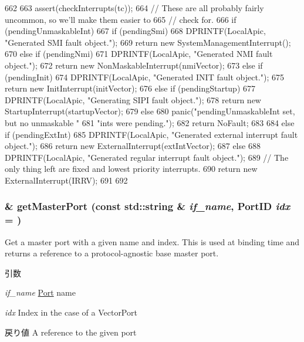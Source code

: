 \begin{DoxyCode}
662 {
663     assert(checkInterrupts(tc));
664     // These are all probably fairly uncommon, so we'll make them easier to
665     // check for.
666     if (pendingUnmaskableInt) {
667         if (pendingSmi) {
668             DPRINTF(LocalApic, "Generated SMI fault object.\n");
669             return new SystemManagementInterrupt();
670         } else if (pendingNmi) {
671             DPRINTF(LocalApic, "Generated NMI fault object.\n");
672             return new NonMaskableInterrupt(nmiVector);
673         } else if (pendingInit) {
674             DPRINTF(LocalApic, "Generated INIT fault object.\n");
675             return new InitInterrupt(initVector);
676         } else if (pendingStartup) {
677             DPRINTF(LocalApic, "Generating SIPI fault object.\n");
678             return new StartupInterrupt(startupVector);
679         } else {
680             panic("pendingUnmaskableInt set, but no unmaskable "
681                     "ints were pending.\n");
682             return NoFault;
683         }
684     } else if (pendingExtInt) {
685         DPRINTF(LocalApic, "Generated external interrupt fault object.\n");
686         return new ExternalInterrupt(extIntVector);
687     } else {
688         DPRINTF(LocalApic, "Generated regular interrupt fault object.\n");
689         // The only thing left are fixed and lowest priority interrupts.
690         return new ExternalInterrupt(IRRV);
691     }
692 }
\end{DoxyCode}
\hypertarget{classX86ISA_1_1Interrupts_ac66222ec5b6b7beb5d1189c07778bc8a}{
\subsubsection[{getMasterPort}]{\& getMasterPort (const std::string \& {\em if\_\-name}, \/  {\bf PortID} {\em idx} = {})}}
\label{classX86ISA_1_1Interrupts_ac66222ec5b6b7beb5d1189c07778bc8a}
Get a master port with a given name and index. This is used at binding time and returns a reference to a protocol-\/agnostic base master port.


\begin{DoxyParams}{引数}
\item[{\em if\_\-name}]\hyperlink{classPort}{Port} name \item[{\em idx}]Index in the case of a VectorPort\end{DoxyParams}
\begin{DoxyReturn}{戻り値}
A reference to the given port 
\end{DoxyReturn}


